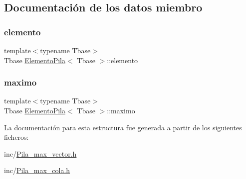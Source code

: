\subsection{Documentación de los datos miembro}
\mbox{\label{structElementoPila_a2c210252f4d74fc9975cba3784a7b0e3}} 
\subsubsection{\texorpdfstring{elemento}{elemento}}
{\footnotesize\ttfamily template$<$typename Tbase$>$ \\
Tbase \hyperlink{structElementoPila}{Elemento\+Pila}$<$ Tbase $>$\+::elemento}

\mbox{\label{structElementoPila_a6e6e77f455669318e9e6fe5e4f52c9bc}} 
\subsubsection{\texorpdfstring{maximo}{maximo}}
{\footnotesize\ttfamily template$<$typename Tbase$>$ \\
Tbase \hyperlink{structElementoPila}{Elemento\+Pila}$<$ Tbase $>$\+::maximo}



La documentación para esta estructura fue generada a partir de los siguientes ficheros\+:\begin{DoxyCompactItemize}
\item 
inc/\hyperlink{Pila__max__vector_8h}{Pila\+\_\+max\+\_\+vector.\+h}\item 
inc/\hyperlink{Pila__max__cola_8h}{Pila\+\_\+max\+\_\+cola.\+h}\end{DoxyCompactItemize}
